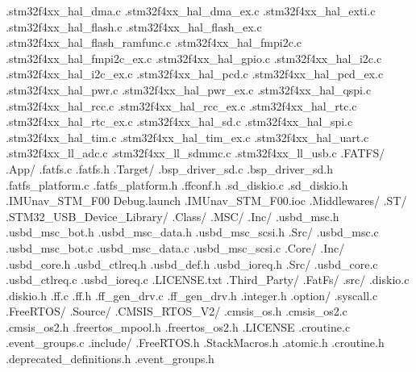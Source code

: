 \documentclass{article}
\begin{document}
{          .stm32f4xx_hal_dma.c
          .stm32f4xx_hal_dma_ex.c
          .stm32f4xx_hal_exti.c
          .stm32f4xx_hal_flash.c
          .stm32f4xx_hal_flash_ex.c
          .stm32f4xx_hal_flash_ramfunc.c
          .stm32f4xx_hal_fmpi2c.c
          .stm32f4xx_hal_fmpi2c_ex.c
          .stm32f4xx_hal_gpio.c
          .stm32f4xx_hal_i2c.c
          .stm32f4xx_hal_i2c_ex.c
          .stm32f4xx_hal_pcd.c
          .stm32f4xx_hal_pcd_ex.c
          .stm32f4xx_hal_pwr.c
          .stm32f4xx_hal_pwr_ex.c
          .stm32f4xx_hal_qspi.c
          .stm32f4xx_hal_rcc.c
          .stm32f4xx_hal_rcc_ex.c
          .stm32f4xx_hal_rtc.c
          .stm32f4xx_hal_rtc_ex.c
          .stm32f4xx_hal_sd.c
          .stm32f4xx_hal_spi.c
          .stm32f4xx_hal_tim.c
          .stm32f4xx_hal_tim_ex.c
          .stm32f4xx_hal_uart.c
          .stm32f4xx_ll_adc.c
          .stm32f4xx_ll_sdmmc.c
          .stm32f4xx_ll_usb.c
    .FATFS/
      .App/
        .fatfs.c
        .fatfs.h
      .Target/
        .bsp_driver_sd.c
        .bsp_driver_sd.h
        .fatfs_platform.c
        .fatfs_platform.h
        .ffconf.h
        .sd_diskio.c
        .sd_diskio.h
    .IMUnav_STM_F00 Debug.launch
    .IMUnav_STM_F00.ioc
    .Middlewares/
      .ST/
        .STM32_USB_Device_Library/
          .Class/
            .MSC/
              .Inc/
                .usbd_msc.h
                .usbd_msc_bot.h
                .usbd_msc_data.h
                .usbd_msc_scsi.h
              .Src/
                .usbd_msc.c
                .usbd_msc_bot.c
                .usbd_msc_data.c
                .usbd_msc_scsi.c
          .Core/
            .Inc/
              .usbd_core.h
              .usbd_ctlreq.h
              .usbd_def.h
              .usbd_ioreq.h
            .Src/
              .usbd_core.c
              .usbd_ctlreq.c
              .usbd_ioreq.c
          .LICENSE.txt
      .Third_Party/
        .FatFs/
          .src/
            .diskio.c
            .diskio.h
            .ff.c
            .ff.h
            .ff_gen_drv.c
            .ff_gen_drv.h
            .integer.h
            .option/
              .syscall.c
        .FreeRTOS/
          .Source/
            .CMSIS_RTOS_V2/
              .cmsis_os.h
              .cmsis_os2.c
              .cmsis_os2.h
              .freertos_mpool.h
              .freertos_os2.h
            .LICENSE
            .croutine.c
            .event_groups.c
            .include/
              .FreeRTOS.h
              .StackMacros.h
              .atomic.h
              .croutine.h
              .deprecated_definitions.h
              .event_groups.h
}
\end{document}
